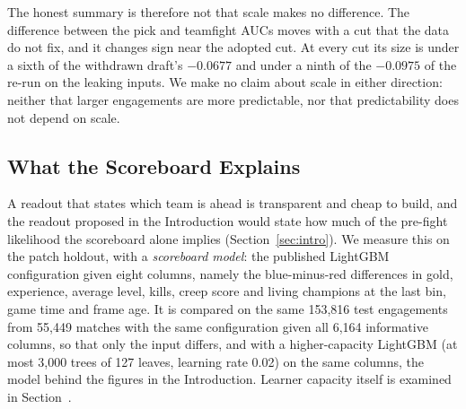 The honest summary is therefore not that scale makes no difference. The difference between the pick and
teamfight AUCs moves with a cut that the data do not fix, and it changes sign near the adopted cut. At
every cut its size is under a sixth of the withdrawn draft's $-0.0677$ and under a ninth of the $-0.0975$
of the re-run on the leaking inputs. We make no claim about scale in either direction: neither that larger
engagements are more predictable, nor that predictability does not depend on scale.

\subsection{What the Scoreboard Explains}\label{sec:pred-scoreboard}

A readout that states which team is ahead is transparent and cheap to build, and the readout proposed in
the Introduction would state how much of the pre-fight likelihood the scoreboard alone implies
(Section~\ref{sec:intro}). We measure this on the patch holdout, with a
\emph{scoreboard model}: the published LightGBM configuration given eight columns, namely the blue-minus-red
differences in gold, experience, average level, kills, creep score and living champions at the last bin,
game time and frame age. It is compared on the same 153,816 test engagements from 55,449 matches with the
same configuration given all 6,164 informative columns, so that only the input differs, and with a
higher-capacity LightGBM (at most 3,000 trees of 127 leaves, learning rate 0.02) on the same columns, the
model behind the figures in the Introduction. Learner capacity itself is examined in
Section~.

